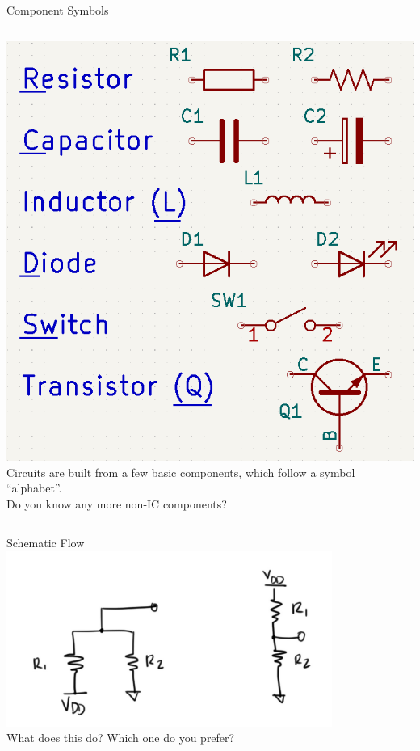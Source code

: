 \documentclass{beamer}
\begin{document}
\begin{frame}{Component Symbols}
  \begin{columns}
    \includegraphics[width=\textwidth]{images/component-alphabet.png}
    Circuits are built from a few basic components, which follow a symbol ``alphabet''.\\

    Do you know any more non-IC components?
  \end{columns}
\end{frame}

\begin{frame}{Schematic Flow}
  \centering
  \includegraphics[width=0.8\textwidth]{images/voltage-div-orient.png}\\
  What does this do? Which one do you prefer?
\end{frame}
\end{document}
